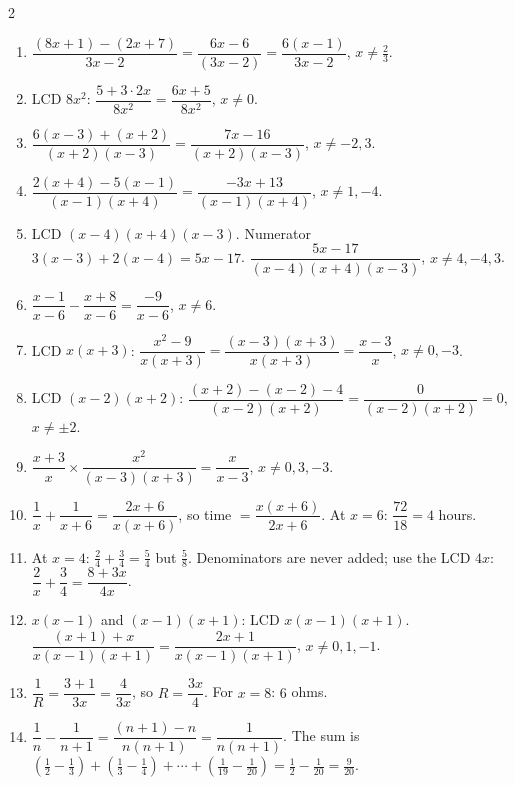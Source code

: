 \documentclass[11pt]{article}
\begin{document}
\begin{keybox}
\begin{multicols}{2}
\small
\begin{enumerate}[leftmargin=*,itemsep=3pt]
  \item $\dfrac{(8x+1)-(2x+7)}{3x-2}=\dfrac{6x - 6}{(3x - 2)}=\dfrac{6(x-1)}{3x-2}$, $x\ne\tfrac23$.
  \item LCD $8x^2$: $\dfrac{5+3\cdot2x}{8x^2}=\dfrac{6x + 5}{8x^2}$, $x\ne0$.
  \item $\dfrac{6(x-3)+(x+2)}{(x+2)(x-3)}=\dfrac{7x - 16}{(x + 2)(x - 3)}$, $x\ne-2,3$.
  \item $\dfrac{2(x+4)-5(x-1)}{(x-1)(x+4)}=\dfrac{-3x + 13}{(x - 1)(x + 4)}$, $x\ne1,-4$.
  \item LCD $(x-4)(x+4)(x-3)$. Numerator $3(x-3)+2(x-4)=5x-17$. $\dfrac{5x - 17}{(x - 4)(x + 4)(x - 3)}$, $x\ne4,-4,3$.
  \item $\dfrac{x-1}{x-6}-\dfrac{x+8}{x-6}=\dfrac{-9}{x-6}$, $x\ne6$.
  \item LCD $x(x+3)$: $\dfrac{x^2-9}{x(x+3)}=\dfrac{(x-3)(x+3)}{x(x+3)}=\dfrac{x-3}{x}$, $x\ne0,-3$.
  \item LCD $(x-2)(x+2)$: $\dfrac{(x+2)-(x-2)-4}{(x-2)(x+2)}=\dfrac{0}{(x-2)(x+2)}=0$, $x\ne\pm2$.
  \item $\dfrac{x+3}{x}\times\dfrac{x^2}{(x-3)(x+3)}=\dfrac{x}{x-3}$, $x\ne0,3,-3$.
  \item $\dfrac1x+\dfrac1{x+6}=\dfrac{2x+6}{x(x+6)}$, so time $=\dfrac{x(x+6)}{2x+6}$. At $x=6$: $\dfrac{72}{18}=4$ hours.
  \item At $x=4$: $\tfrac24+\tfrac34=\tfrac54$ but $\tfrac{5}{8}$. Denominators are never added; use the LCD $4x$: $\dfrac2x+\dfrac34=\dfrac{8+3x}{4x}$.
  \item $x(x-1)$ and $(x-1)(x+1)$: LCD $x(x-1)(x+1)$. $\dfrac{(x+1)+x}{x(x-1)(x+1)}=\dfrac{2x + 1}{x(x - 1)(x + 1)}$, $x\ne0,1,-1$.
  \item $\dfrac1R=\dfrac{3+1}{3x}=\dfrac{4}{3x}$, so $R=\dfrac{3x}{4}$. For $x=8$: $6$ ohms.
  \item $\dfrac1n-\dfrac1{n+1}=\dfrac{(n+1)-n}{n(n+1)}=\dfrac1{n(n+1)}$. The sum is $(\tfrac12-\tfrac13)+(\tfrac13-\tfrac14)+\cdots+(\tfrac1{19}-\tfrac1{20})=\tfrac12-\tfrac1{20}=\tfrac{9}{20}$.
\end{enumerate}
\end{multicols}
\end{keybox}
\end{document}
